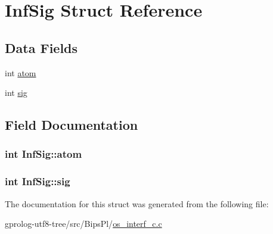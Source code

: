 \hypertarget{structInfSig}{}\section{Inf\+Sig Struct Reference}
\label{structInfSig}
\subsection*{Data Fields}
\begin{DoxyCompactItemize}
\item 
int \hyperlink{structInfSig_a802a7fecafff618606688d70860c6ce4}{atom}
\item 
int \hyperlink{structInfSig_a089058351323d661ad411c87017b6647}{sig}
\end{DoxyCompactItemize}


\subsection{Field Documentation}
\subsubsection[{\texorpdfstring{atom}{atom}}]{\setlength{\rightskip}{0pt plus 5cm}int Inf\+Sig\+::atom}\hypertarget{structInfSig_a802a7fecafff618606688d70860c6ce4}{}\label{structInfSig_a802a7fecafff618606688d70860c6ce4}
\subsubsection[{\texorpdfstring{sig}{sig}}]{\setlength{\rightskip}{0pt plus 5cm}int Inf\+Sig\+::sig}\hypertarget{structInfSig_a089058351323d661ad411c87017b6647}{}\label{structInfSig_a089058351323d661ad411c87017b6647}


The documentation for this struct was generated from the following file\+:\begin{DoxyCompactItemize}
\item 
gprolog-\/utf8-\/tree/src/\+Bips\+Pl/\hyperlink{os__interf__c_8c}{os\+\_\+interf\+\_\+c.\+c}\end{DoxyCompactItemize}
